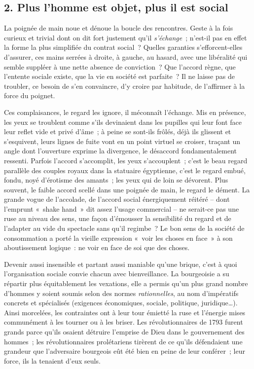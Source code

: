\documentclass[french,twoside]{book} %
\begin{document}
\subsection[{2. Plus l’homme est objet, plus il est social}]{\textsc{2.} Plus l’homme est objet, plus il est social}
\noindent La poignée de main noue et dénoue la boucle des rencontres. Geste à la fois curieux et trivial dont on dit fort justement qu’il \emph{s’échange} ; n’est-il pas en effet la forme la plus simplifiée du contrat social ? Quelles garanties s’efforcent-elles d’assurer, ces mains serrées à droite, à gauche, au hasard, avec une libéralité qui semble suppléer à une nette absence de conviction ? Que l’accord règne, que l’entente sociale existe, que la vie en société est parfaite ? Il ne laisse pas de troubler, ce besoin de s’en convaincre, d’y croire par habitude, de l’affirmer à la force du poignet.\par
Ces complaisances, le regard les ignore, il méconnaît l’échange. Mis en présence, les yeux se troublent comme s’ils devinaient dans les pupilles qui leur font face leur reflet vide et privé d’âme ; à peine se sont-ils frôlés, déjà ils glissent et s’esquivent, leurs lignes de fuite vont en un point virtuel se croiser, traçant un angle dont l’ouverture exprime la divergence, le désaccord fondamentalement ressenti. Parfois l’accord s’accomplit, les yeux s’accouplent ; c’est le beau regard parallèle des couples royaux dans la statuaire égyptienne, c’est le regard embué, fondu, noyé d’érotisme des amants ; les yeux qui de loin se dévorent. Plus souvent, le faible accord scellé dans une poignée de main, le regard le dément. La grande vogue de l’accolade, de l’accord social énergiquement réitéré – dont l’emprunt « shake hand » dit assez l’usage commercial – ne serait-ce pas une ruse au niveau des sens, une façon d’émousser la sensibilité du regard et de l’adapter au vide du spectacle sans qu’il regimbe ? Le bon sens de la société de consommation a porté la vieille expression « voir les choses en face » à son aboutissement logique : ne voir en face de soi que des choses.\par
Devenir aussi insensible et partant aussi maniable qu’une brique, c’est à quoi l’organisation sociale convie chacun avec bienveillance. La bourgeoisie a su répartir plus équitablement les vexations, elle a permis qu’un plus grand nombre d’hommes y soient soumis selon des normes \emph{rationnelles}, au nom d’impératifs concrets et spécialisés (exigences économiques, sociale, politique, juridique…). Ainsi morcelées, les contraintes ont à leur tour émietté la ruse et l’énergie mises communément à les tourner ou à les briser. Les révolutionnaires de 1793 furent grands parce qu’ils osaient détruire l’emprise de Dieu dans le gouvernement des hommes ; les révolutionnaires prolétariens tirèrent de ce qu’ils défendaient une grandeur que l’adversaire bourgeois eût été bien en peine de leur conférer ; leur force, ils la tenaient d’eux seuls.\par
\end{document}
